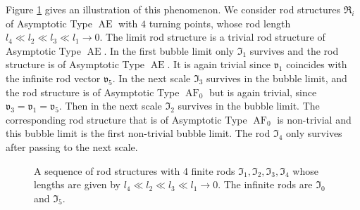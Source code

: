 \documentclass[a4paper,11pt]{amsart}
\theoremstyle{definition}
\numberwithin{equation}{section}
\newcommand{\mv} {\mathfrak v}
\newcommand{\mI} {\mathfrak I}
\newcommand{\mR} {\mathfrak R}
\DeclareMathOperator{\Ae}{AE}
\DeclareMathOperator{\AF}{AF}
\begin{document}
 Figure \ref{Figure:Merging and deeper scale} gives an illustration of this phenomenon. We consider  rod structures $\mR_i$ of Asymptotic Type $\Ae$ with $4$ turning points,  whose rod length $l_4\ll l_2\ll l_3\ll l_1\to0$. The limit rod structure is a trivial rod structure of Asymptotic Type $\Ae$. In the first bubble limit only  $\mI_1$ survives and the rod structure is  of Asymptotic Type $\Ae$. It is again trivial since $\mv_1$ coincides with the infinite rod vector $\mv_5$. In the next scale  $\mI_3$ survives in the bubble limit, and the rod structure is of Asymptotic Type $\AF_0$ but is again trivial, since $\mv_3=\mv_1=\mv_5$. Then in the next scale $\mI_2$ survives in the bubble limit. The corresponding  rod structure that is of Asymptotic Type $\AF_0$ is non-trivial and this bubble limit is the first non-trivial bubble limit. The rod $\mI_4$ only survives after passing to the next scale. 
\begin{figure}[ht]
	\caption{A sequence of rod structures with 4 finite rods $\mI_1,\mI_2,\mI_3,\mI_4$ whose lengths are given by $l_4\ll l_2\ll l_3\ll l_1\to0$. The infinite rods are $\mI_0$ and $\mI_5$.}
	 \label{Figure:Merging and deeper scale}   
\end{figure}
\end{document}
